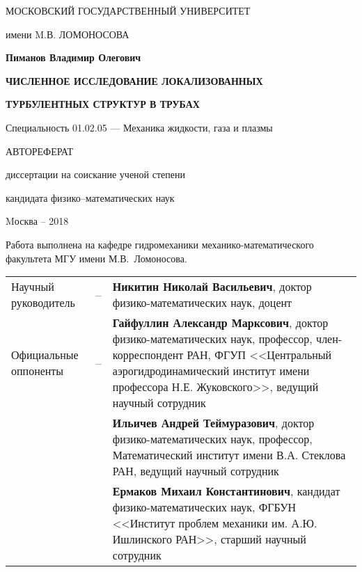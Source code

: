 \documentclass[a4paper,14pt,
oneside]{extbook}
\begin{document}
 \sloppy

\thispagestyle{empty}
\centerline{МОСКОВСКИЙ ГОСУДАРСТВЕННЫЙ УНИВЕРСИТЕТ}
\centerline{имени M.В. ЛОМОНОСОВА}

\vfill

\vfill
\vfill

\centerline{\bf Пиманов Владимир Олегович} \vfill
\centerline{\bf ЧИСЛЕННОЕ ИССЛЕДОВАНИЕ ЛОКАЛИЗОВАННЫХ}
\centerline{\bf ТУРБУЛЕНТНЫХ СТРУКТУР В ТРУБАХ}
 \centerline{\bf}
 \centerline{\bf }
\centerline{Специальность 01.02.05
--- Механика жидкости, газа и плазмы} 
\vfill \vfill
\centerline{АВТОРЕФЕРАТ}
\centerline{диссертации на соискание ученой степени} 
\centerline{кандидата физико--математических наук} 
\vfill \vfill \vfill \vfill 
\centerline{Mосква -- 2018}
\normalsize


\newcommand{\vsp}{\vspace{0.25cm}}

\newpage
\thispagestyle{empty} Работа выполнена на кафедре гидромеханики механико-математического факультета МГУ имени М.В.~Ломоносова.

\vsp

\noindent \begin{tabular}{@{}p{5.6cm}p{0.3cm}p{10.7cm}@{}}
Научный руководитель & -- & \textbf{Никитин Николай Васильевич},
доктор физико-математических наук, доцент\vsp \\
Официальные оппоненты &  -- & \textbf{Гайфуллин Александр Марксович},
доктор физико-математических наук, профессор,
член-корреспондент РАН,
ФГУП <<Центральный аэрогидродинамический институт имени профессора Н.Е. Жуковского>>, ведущий научный сотрудник\vsp\\
&  & 
\textbf{Ильичев Андрей Теймуразович},
доктор физико-математических наук, профессор,
Математический институт имени В.А. Стеклова РАН, 
ведущий научный сотрудник\vsp\\
&  & 
\textbf{Ермаков Михаил Константинович},
кандидат физико-математических наук, ФГБУН <<Институт проблем механики им. А.Ю. Ишлинского РАН>>, 
старший научный сотрудник\vsp\\
\end{tabular}
\vspace{1mm}
\end{document}
